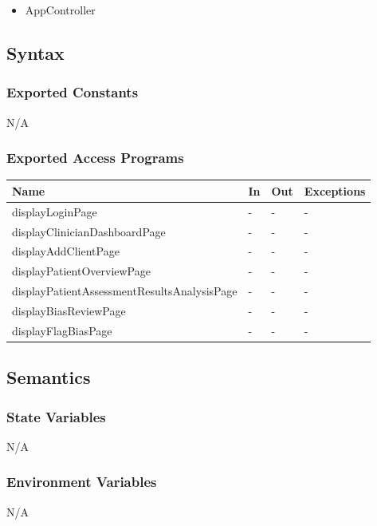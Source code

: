 \documentclass[12pt, titlepage]{article}
\begin{document}
\begin{itemize}
  \item AppController
\end{itemize}

\subsection{Syntax}

\subsubsection{Exported Constants}

N/A

\subsubsection{Exported Access Programs}

\begin{center}
\begin{tabular}{p{8cm} p{2cm} p{2cm} p{2cm}}
\hline
\textbf{Name} & \textbf{In} & \textbf{Out} & \textbf{Exceptions} \\
\hline
displayLoginPage & - & - & - \\
displayClinicianDashboardPage & - & - & - \\
displayAddClientPage & - & - & - \\
displayPatientOverviewPage & - & - & - \\
displayPatientAssessmentResultsAnalysisPage & - & - & - \\
displayBiasReviewPage & - & - & - \\
displayFlagBiasPage & - & - & - \\
\hline
\end{tabular}
\end{center}

\subsection{Semantics}

\subsubsection{State Variables}
N/A

\subsubsection{Environment Variables}
N/A
\end{document}
